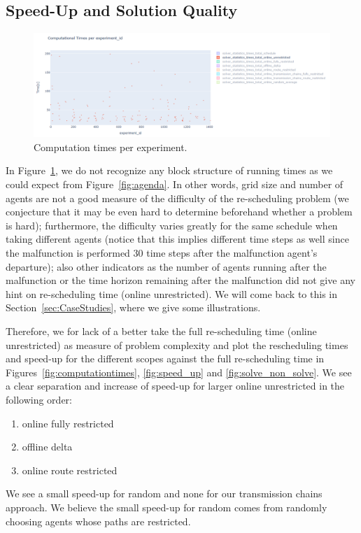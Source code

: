 \documentclass{article}
\begin{document}
\subsection{Speed-Up and Solution Quality}

\begin{figure}[hbtp]
    \includegraphics[width=\textwidth]{Figures/04_computational_results/times_total_per_experiment_id.PNG}
	\caption{Computation times per experiment.}
	\label{fig:computationtimesexperimentid}
\end{figure}
In Figure~\ref{fig:computationtimesexperimentid}, we do not recognize any block structure of running times as we could expect from Figure~\ref{fig:agenda}. In other words, grid size and number of agents are not a good measure of the difficulty of the re-scheduling problem (we conjecture that it may be even hard to determine beforehand whether a problem is hard); furthermore, the difficulty varies greatly for the same schedule when taking different agents (notice that this implies different time steps as well since the malfunction is performed 30 time steps after the malfunction agent's departure); also other indicators as the number of agents running after the malfunction or the time horizon remaining after the malfunction did not give any hint on re-scheduling time (online unrestricted). We will come back to this in Section~\ref{sec:CaseStudies}, where we give some illustrations.

Therefore, we for lack of a better take the full re-scheduling time (online unrestricted) as measure of problem complexity and plot the rescheduling times and speed-up for the different scopes against the full re-scheduling time in Figures~\ref{fig:computationtimes}, \ref{fig:speed_up} and \ref{fig:solve_non_solve}.
We see a clear separation and increase of speed-up for larger online unrestricted in the following order:
\begin{enumerate}
    \item online fully restricted
    \item offline delta
    \item online route restricted
\end{enumerate}
We see a small speed-up for random and none for our transmission chains approach. We believe the small speed-up for random comes from randomly choosing agents whose paths are restricted.
\end{document}
